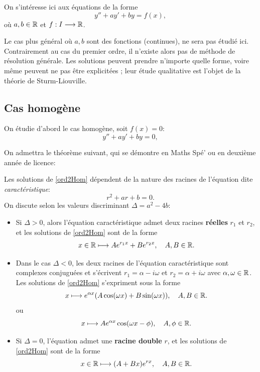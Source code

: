 \documentclass[../main.tex]{subfiles}
\begin{document}
On s'intéresse ici aux équations de la forme
	\begin{equation}\label{ord2Lin}
		y'' + ay' + by = f(x),\tag{E}
	\end{equation}
où $a,b\in\mathbb R$ et $f:I\longrightarrow\mathbb R$.

Le cas plus général où $a,b$ sont des fonctions (continues), ne sera pas étudié ici. Contrairement au cas du premier ordre, il n'existe alors pas de méthode de résolution générale. Les solutions peuvent prendre n'importe quelle forme, voire même peuvent ne pas être explicitées ; leur étude qualitative est l'objet de la théorie de Sturm-Liouville.

\subsection{Cas homogène}

On étudie d'abord le cas homogène, soit $f(x)=0$:
\begin{equation}\label{ord2Hom}
y'' + ay' + by = 0,\tag{H}
\end{equation}

On admettra le théorème suivant, qui se démontre en Maths Spé' ou en deuxième année de licence:
\begin{thm}
	Les solutions de \eqref{ord2Hom} dépendent de la nature des racines de l'équation dite \textit{caractéristique}:
	\[
	r^2 + ar + b = 0.
	\]
	On discute selon les valeurs discriminant $\Delta=a^2 - 4b$:\begin{itemize}
		\item Si $\Delta> 0$, alors l'équation caractéristique admet deux racines \textbf{réelles} $r_1$ et $r_2$, et les solutions de \eqref{ord2Hom} sont de la forme
			\[
			x\in\mathbb R\longmapsto Ae^{r_1x} + Be^{r_2x},\quad A,B\in\mathbb R.
			\]
		\item Dans le cas $\Delta<0$, les deux racines de l'équation caractéristique sont complexes conjuguées et s'écrivent $r_1=\alpha- i\omega$ et $r_2=\alpha+i\omega$ avec $\alpha,\omega\in\mathbb R$. Les solutions de \eqref{ord2Hom} s'expriment sous la forme
			\[
			x\longmapsto e^{\alpha x}(A\cos(\omega x)+B\sin(\omega x)),\quad A,B\in\mathbb R.
			\]
		ou
			\[
			x\longmapsto Ae^{\alpha x}\cos(\omega x-\phi),\quad A,\phi\in\mathbb R.
			\]
		\item Si $\Delta=0$, l'équation admet une \textbf{racine double} $r$, et les solutions de \eqref{ord2Hom} sont de la forme
			\[
			x\in\mathbb R\longmapsto (A+Bx)e^{rx},\quad A,B\in\mathbb R.
			\]
	\end{itemize}
\end{thm}
\end{document}
